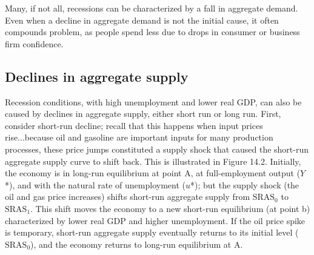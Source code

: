 \documentclass[11pt]{article} %
\begin{document}
Many, if not all, recessions can be characterized by a fall in aggregate demand. Even when a decline in aggregate demand is not the initial cause, it often compounds problem, as people spend less due to drops in consumer or business firm confidence.

\subsection*{Declines in aggregate supply}
Recession conditions, with high unemployment and lower real GDP, can also be caused by declines in aggregate supply, either short run or long run. First, consider short-run decline; recall that this happens when input prices rise...because oil and gasoline are important inputs for many production processes, these price jumps constituted a supply shock that caused the short-run aggregate supply curve to shift back. This is illustrated in Figure 14.2. Initially, the economy is in long-run equilibrium at point A, at full-employment output (\(Y\)*), and with the natural rate of unemployment (\(u\)*); but the supply shock (the oil and gas price increases) shifts short-run aggregate supply from \(\text{SRAS}_0\) to \(\text{SRAS}_1\). This shift moves the economy to a new short-run equilibrium (at point b) characterized by lower real GDP and higher unemployment. If the oil price spike is temporary, short-run aggregate supply eventually returns to its initial level (\(\text{SRAS}_0\)), and the economy returns to long-run equilibrium at A.
\end{document}
